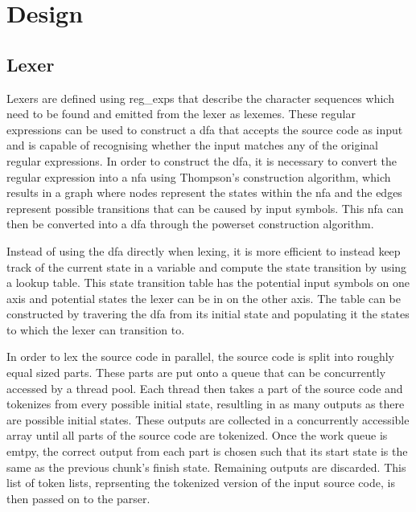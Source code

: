 \chapter{Design} \label{design}

\section{Lexer}
Lexers are defined using \glspl{reg_exp} that describe the character sequences
which need to be found and emitted from the lexer as lexemes. These regular
expressions can be used to construct a \gls{dfa} that accepts the source
code as input and is capable of recognising whether the input matches any of
the original regular expressions. In order to construct the \gls{dfa}, it is
necessary to convert the regular expression into a \gls{nfa} using Thompson's
construction algorithm, which results in a graph where nodes represent the
states within the \gls{nfa} and the edges represent possible transitions that
can be caused by input symbols. This \gls{nfa} can then be converted into a
\gls{dfa} through the powerset construction algorithm. 


Instead of using the \gls{dfa} directly when lexing, it is more efficient
to instead keep track of the current state in a variable and compute the
state transition by using a lookup table. This state transition table has the
potential input symbols on one axis and potential states the lexer can be in on
the other axis. The table can be constructed by travering the \gls{dfa} from its
initial state and populating it the states to which the lexer can transition to.


In order to lex the source code in parallel, the source code is split into
roughly equal sized parts. These parts are put onto a queue that can be
concurrently accessed by a thread pool. Each thread then takes a part of the
source code and tokenizes from every possible initial state, resultling in as
many outputs as there are possible initial states. These outputs are collected
in a concurrently accessible array until all parts of the source code are
tokenized. Once the work queue is emtpy, the correct output from each part is
chosen such that its start state is the same as the previous chunk's finish
state. Remaining outputs are discarded. This list of token lists, reprsenting
the tokenized version of the input source code, is then passed on to the parser.

